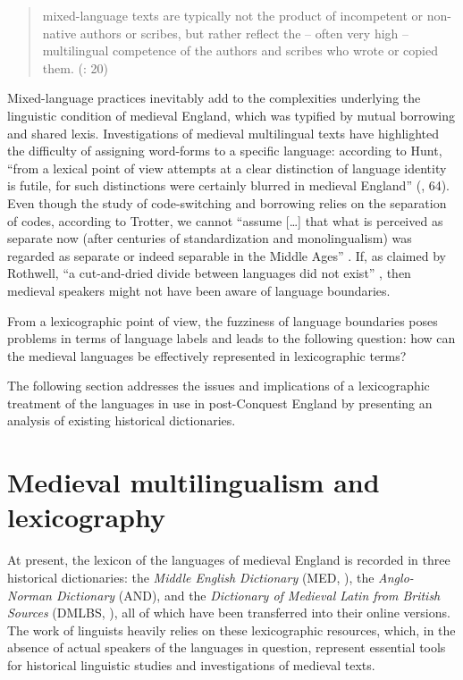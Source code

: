 \documentclass[output=paper,colorlinks,citecolor=brown,arabicfont,chinesefont]{langscibook}
\begin{document}
\begin{quote}
    mixed-language texts are typically not the product of incompetent or non-native authors or scribes, but rather reflect the – often very high – multilingual competence of the authors and scribes who wrote or copied them. (\citealt{SchendlWright2011}:  20)
\end{quote}

Mixed-language practices inevitably add to the complexities underlying the linguistic condition of medieval England, which was typified by mutual borrowing and shared lexis. Investigations of medieval multilingual texts have highlighted the difficulty of assigning word-forms to a specific language: according to Hunt, “from a lexical point of view attempts at a clear distinction of language identity is futile, for such distinctions were certainly blurred in medieval England” (\citealt{Hunt2011}, 64). Even though the study of code-switching and borrowing relies on the separation of codes, according to Trotter, we cannot “assume […] that what is perceived as separate now (after centuries of standardization and monolingualism) was regarded as separate or indeed separable in the Middle Ages” \citep[157]{Trotter2011}. If, as claimed by Rothwell, “a cut-and-dried divide between languages did not exist” \citep[545]{Rothwell1998}, then medieval speakers might not have been aware of language boundaries. 

From a lexicographic point of view, the fuzziness of language boundaries poses problems in terms of language labels and leads to the following question: how can the medieval languages be effectively represented in lexicographic terms? 

The following section addresses the issues and implications of a lexicographic treatment of the languages in use in post-Conquest England by presenting an analysis of existing historical dictionaries.

\section{Medieval multilingualism and lexicography}

At present, the lexicon of the languages of medieval England is recorded in three historical dictionaries: the \emph{Middle English Dictionary} (MED, \citealt{MED}), the \emph{Anglo-Norman Dictionary} (AND), and the \emph{Dictionary of Medieval Latin from British Sources} (DMLBS, \citealt{DMLBS}), all of which have been transferred into their online versions. The work of linguists heavily relies on these lexicographic resources, which, in the absence of actual speakers of the languages in question, represent essential tools for historical linguistic studies and investigations of medieval texts.
\end{document}
